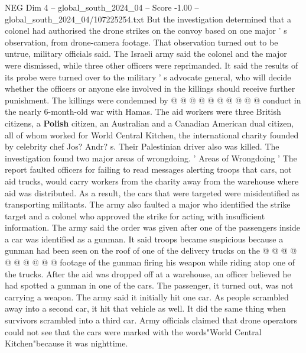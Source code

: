 \begin{textsample}{NEG Dim 4 – global\_south\_2024\_04 – Score -1.00 – global\_south\_2024\_04/107225254.txt}
But the investigation determined that a colonel had authorised the drone strikes on the convoy based on one major ' s observation, from drone-camera footage.
That observation turned out to be untrue, military officials said.
The Israeli army said the colonel and the major were dismissed, while three other officers were reprimanded.
It said the results of its probe were turned over to the military ' s advocate general, who will decide whether the officers or anyone else involved in the killings should receive further punishment.
The killings were condemned by @ @ @ @ @ @ @ @ @ @ conduct in the nearly 6-month-old war with Hamas.
The aid workers were three British citizens, a \textbf{Polish} citizen, an Australian and a Canadian American dual citizen, all of whom worked for World Central Kitchen, the international charity founded by celebrity chef Jos?
Andr? s.
Their Palestinian driver also was killed.
The investigation found two major areas of wrongdoing. ' Areas of Wrongdoing ' The report faulted officers for failing to read messages alerting troops that cars, not aid trucks, would carry workers from the charity away from the warehouse where aid was distributed.
As a result, the cars that were targeted were misidentified as transporting militants.
The army also faulted a major who identified the strike target and a colonel who approved the strike for acting with insufficient information.
The army said the order was given after one of the passengers inside a car was identified as a gunman.
It said troops became suspicious because a gunman had been seen on the roof of one of the delivery trucks on the @ @ @ @ @ @ @ @ @ @ footage of the gunman firing his weapon while riding atop one of the trucks.
After the aid was dropped off at a warehouse, an officer believed he had spotted a gunman in one of the cars.
The passenger, it turned out, was not carrying a weapon.
The army said it initially hit one car.
As people scrambled away into a second car, it hit that vehicle as well.
It did the same thing when survivors scrambled into a third car.
Army officials claimed that drone operators could not see that the cars were marked with the words"World Central Kitchen"because it was nighttime.

\end{textsample}
